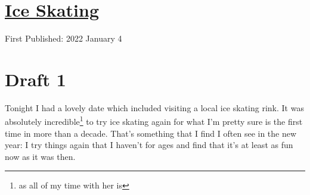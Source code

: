 \documentclass[12pt]{article}[titlepage]
\newcommand{\1}{\={a}}
\newcommand{\2}{\={e}}
\newcommand{\3}{\={\i}}
\newcommand{\4}{\=o}
\newcommand{\5}{\=u}
\newcommand{\6}{\={A}}
\renewcommand{\,}{\textsuperscript{,}}
\begin{document}
\doublespacing
\section{\href{ice-skating.html}{Ice Skating}}
First Published: 2022 January 4
\section{Draft 1}
Tonight I had a lovely date which included visiting a local ice skating rink.
It was absolutely incredible\footnote{as all of my time with her is} to try ice skating again for what I'm pretty sure is the first time in more than a decade.
That's something that I find I often see in the new year: I try things again that I haven't for ages and find that it's at least as fun now as it was then.
\end{document}
